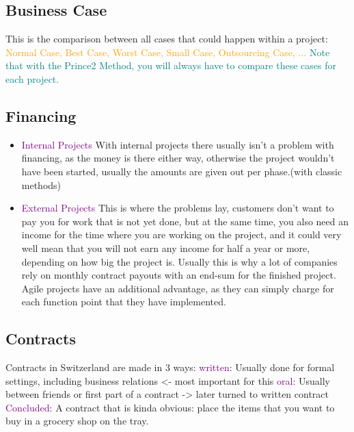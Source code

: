 \documentclass[main.tex,fontsize=12pt,paper=a4,paper=landscape,DIV=calc,]{scrartcl}
\begin{document}
\begin{multicols*}{2}
\subsection{Business Case}
This is the comparison between all cases that could happen within a project:\newline
\textcolor{orange}{Normal Case, Best Case, Worst Case, Small Case, Outsourcing Case, ...}\newline
\textcolor{teal}{Note that with the Prince2 Method, you will always have to compare these cases for each project.} 

\subsection{Financing} 
\begin{itemize}
\item \textcolor{purple}{Internal Projects}\newline
  With internal projects there usually isn't a problem with financing, as the money is there either way, otherwise the project wouldn't have been started, usually the amounts are given out per phase.(with classic methods)
\item \textcolor{purple}{External Projects}\newline
  This is where the problems lay, customers don't want to pay you for work that is not yet done, but at the same time, you also need an income for the time where you are working on the project, and it could very well mean that you will not earn any income for half a year or more, depending on how big the project is.\newline
  Usually this is why a lot of companies rely on monthly contract payouts with an end-sum for the finished project.\newline
  Agile projects have an additional advantage, as they can simply charge for each function point that they have implemented.
\end{itemize} 

\subsection{Contracts}
Contracts in Switzerland are made in 3 ways:\newline
\textcolor{purple}{written}: \newline
Usually done for formal settings, including business relations <- most important for this \newline
\textcolor{purple}{oral}:\newline
Usually between friends or first part of a contract -> later turned to written contract\newline
\textcolor{purple}{Concluded}:\newline
A contract that is kinda obvious: place the items that you want to buy in a grocery shop on the tray.


\end{multicols*}
\end{document}
